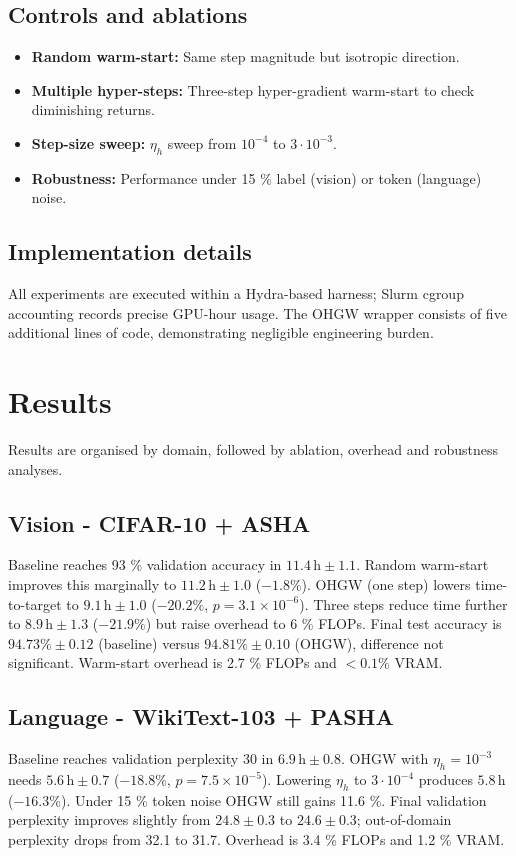 \documentclass{article}
\begin{document}
\subsection{Controls and ablations}
\begin{itemize}
    \item \textbf{Random warm-start:} Same step magnitude but isotropic direction.
    \item \textbf{Multiple hyper-steps:} Three-step hyper-gradient warm-start to check diminishing returns.
    \item \textbf{Step-size sweep:} \(\eta_h\) sweep from \(10^{-4}\) to \(3\cdot10^{-3}\).
    \item \textbf{Robustness:} Performance under 15 \% label (vision) or token (language) noise.
\end{itemize}

\subsection{Implementation details}
All experiments are executed within a Hydra-based harness; Slurm cgroup accounting records precise GPU-hour usage. The OHGW wrapper consists of five additional lines of code, demonstrating negligible engineering burden.

\section{Results}
Results are organised by domain, followed by ablation, overhead and robustness analyses.

\subsection{Vision - CIFAR-10 + ASHA}
Baseline reaches 93 \% validation accuracy in \(11.4\,\mathrm{h} \pm 1.1\). Random warm-start improves this marginally to \(11.2\,\mathrm{h} \pm 1.0\) (\(-1.8 \%\)). OHGW (one step) lowers time-to-target to \(9.1\,\mathrm{h} \pm 1.0\) (\(-20.2 \%\), \(p = 3.1 \times 10^{-6}\)). Three steps reduce time further to \(8.9\,\mathrm{h} \pm 1.3\) (\(-21.9 \%\)) but raise overhead to 6 \% FLOPs. Final test accuracy is \(94.73 \% \pm 0.12\) (baseline) versus \(94.81 \% \pm 0.10\) (OHGW), difference not significant. Warm-start overhead is 2.7 \% FLOPs and \(<0.1 \%\) VRAM.

\subsection{Language - WikiText-103 + PASHA}
Baseline reaches validation perplexity 30 in \(6.9\,\mathrm{h} \pm 0.8\). OHGW with \(\eta_h = 10^{-3}\) needs \(5.6\,\mathrm{h} \pm 0.7\) (\(-18.8 \%\), \(p = 7.5 \times 10^{-5}\)). Lowering \(\eta_h\) to \(3\cdot10^{-4}\) produces \(5.8\,\mathrm{h}\) (\(-16.3 \%\)). Under 15 \% token noise OHGW still gains 11.6 \%. Final validation perplexity improves slightly from \(24.8 \pm 0.3\) to \(24.6 \pm 0.3\); out-of-domain perplexity drops from 32.1 to 31.7. Overhead is 3.4 \% FLOPs and 1.2 \% VRAM.
\end{document}
